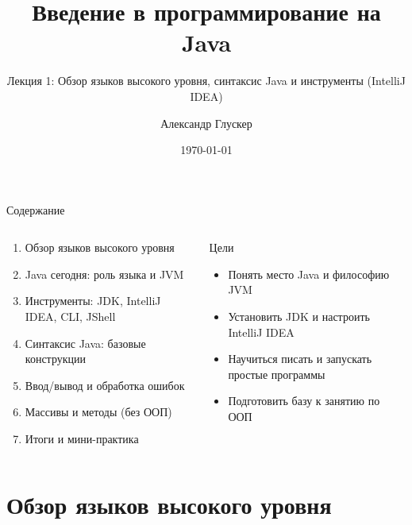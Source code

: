 \documentclass[aspectratio=169]{beamer}
\title{Введение в программирование на Java}
\subtitle{Лекция 1: Обзор языков высокого уровня, синтаксис Java и инструменты (IntelliJ IDEA)}
\author{Александр Глускер}
\institute{РУТ МИИТ/ВИШ}
\date{\today}
\begin{document}
\begin{frame}
  \titlepage
\end{frame}

\begin{frame}{Содержание}
  \begin{columns}[T,onlytextwidth]
    \begin{column}{0.55\textwidth}
      \begin{enumerate}
        \item Обзор языков высокого уровня
        \item Java сегодня: роль языка и JVM
        \item Инструменты: JDK, IntelliJ IDEA, CLI, JShell
        \item Синтаксис Java: базовые конструкции
        \item Ввод/вывод и обработка ошибок
        \item Массивы и методы (без ООП)
        \item Итоги и мини-практика
      \end{enumerate}
    \end{column}
    \begin{column}{0.45\textwidth}
      \begin{block}{Цели}
        \begin{itemize}
          \item Понять место Java и философию JVM
          \item Установить JDK и настроить IntelliJ IDEA
          \item Научиться писать и запускать простые программы
          \item Подготовить базу к занятию по ООП
        \end{itemize}
      \end{block}
    \end{column}
  \end{columns}
\end{frame}

\section{Обзор языков высокого уровня}
\end{document}
